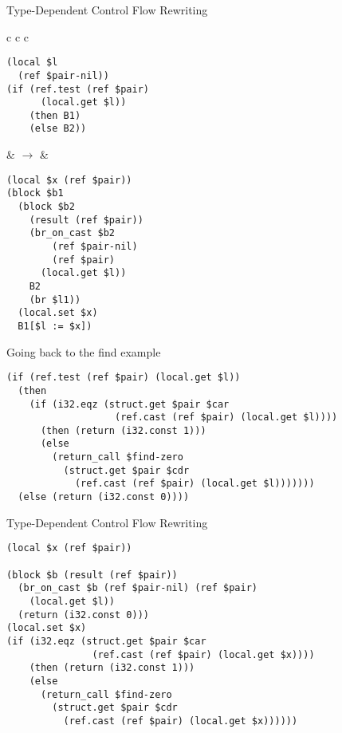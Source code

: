 \documentclass{beamer}
\begin{document}
\begin{frame}[fragile]{Type-Dependent Control Flow Rewriting}{}
  \begin{center}
  \begin{tabular}{c c c}
    \begin{minipage}{\widthof{\small\texttt{(if (ref.test (ref \$pair)}}}
      \small
\begin{verbatim}
(local $l
  (ref $pair-nil))
(if (ref.test (ref $pair)
      (local.get $l))
    (then B1)
    (else B2))
\end{verbatim}
\end{minipage}
    &
    $\rightarrow$
    &
\begin{minipage}{\widthof{\small\texttt{....(result (ref \$pair))}}}
  \small
\begin{verbatim}
(local $x (ref $pair))
(block $b1
  (block $b2
    (result (ref $pair))
    (br_on_cast $b2
        (ref $pair-nil)
        (ref $pair)
      (local.get $l))
    B2
    (br $l1))
  (local.set $x)
  B1[$l := $x])
\end{verbatim}
\end{minipage}
  \end{tabular}
  \end{center}
\end{frame}
\begin{frame}[fragile]{Going back to the find example}
\small
\begin{verbatim}
(if (ref.test (ref $pair) (local.get $l))
  (then
    (if (i32.eqz (struct.get $pair $car
                   (ref.cast (ref $pair) (local.get $l))))
      (then (return (i32.const 1)))
      (else
        (return_call $find-zero
          (struct.get $pair $cdr
            (ref.cast (ref $pair) (local.get $l)))))))
  (else (return (i32.const 0))))
\end{verbatim}
\end{frame}

\begin{frame}[fragile]{Type-Dependent Control Flow Rewriting}
\small
\begin{verbatim}
(local $x (ref $pair))

(block $b (result (ref $pair))
  (br_on_cast $b (ref $pair-nil) (ref $pair)
    (local.get $l))
  (return (i32.const 0)))
(local.set $x)
(if (i32.eqz (struct.get $pair $car
               (ref.cast (ref $pair) (local.get $x))))
    (then (return (i32.const 1)))
    (else
      (return_call $find-zero
        (struct.get $pair $cdr
          (ref.cast (ref $pair) (local.get $x))))))
\end{verbatim}
\end{frame}
\end{document}
